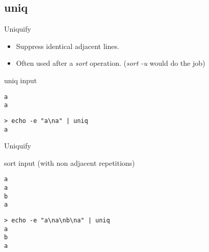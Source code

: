 \subsection{uniq}

\begin{frame}[fragile]{Uniquify}
\begin{itemize}
\item Suppress identical adjacent lines.
  \pause \item Often used after a \emph{sort} operation. (\emph{sort -u} would do the job)
\end{itemize}
  \pause
  \begin{exampleblock}{uniq input}
    \begin{lstlisting}[showstringspaces=false,basicstyle=\tiny]
a
a
    \end{lstlisting}
  \end{exampleblock}
  \pause
  \begin{exampleblock}{}
    \begin{lstlisting}[showstringspaces=false,basicstyle=\tiny]
> echo -e "a\na" | uniq
a
    \end{lstlisting}
  \end{exampleblock}
\end{frame}

\begin{frame}[fragile]{Uniquify}
  \begin{exampleblock}{sort input (with non adjacent repetitions)}
    \begin{lstlisting}[showstringspaces=false,basicstyle=\tiny]
a
a
b
a
    \end{lstlisting}
  \end{exampleblock}
  \pause
  \begin{exampleblock}{}
    \begin{lstlisting}[showstringspaces=false,basicstyle=\tiny]
> echo -e "a\na\nb\na" | uniq
a
b
a
    \end{lstlisting}
  \end{exampleblock}
\end{frame}
